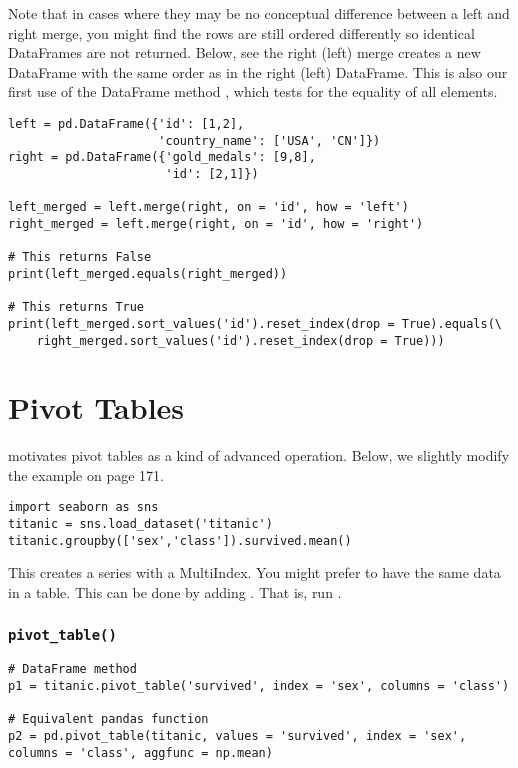 Note that in cases where they may be no conceptual difference between a left and right merge, you might find the rows are still ordered differently so identical DataFrames are not returned. Below, see the right (left) merge creates a new DataFrame with the same order as in the right (left) DataFrame. This is also our first use of the DataFrame method , which tests for the equality of all elements. 

\begin{lstlisting}
left = pd.DataFrame({'id': [1,2], 
                     'country_name': ['USA', 'CN']})
right = pd.DataFrame({'gold_medals': [9,8], 
                      'id': [2,1]})

left_merged = left.merge(right, on = 'id', how = 'left')
right_merged = left.merge(right, on = 'id', how = 'right')

# This returns False
print(left_merged.equals(right_merged))

# This returns True
print(left_merged.sort_values('id').reset_index(drop = True).equals(\
    right_merged.sort_values('id').reset_index(drop = True)))
\end{lstlisting}


\section{Pivot Tables}

\cite{vanderplas2016python} motivates pivot tables as a kind of advanced  operation. Below, we slightly modify the example on page 171.

\begin{lstlisting}
import seaborn as sns
titanic = sns.load_dataset('titanic')
titanic.groupby(['sex','class']).survived.mean()
\end{lstlisting}

This creates a series with a MultiIndex. You might prefer to have the same data in a table. This can be done by adding . That is, run . 

\subsubsection{\texttt{pivot\_table()}}

\begin{lstlisting}
# DataFrame method
p1 = titanic.pivot_table('survived', index = 'sex', columns = 'class')

# Equivalent pandas function
p2 = pd.pivot_table(titanic, values = 'survived', index = 'sex', columns = 'class', aggfunc = np.mean)
\end{lstlisting}

